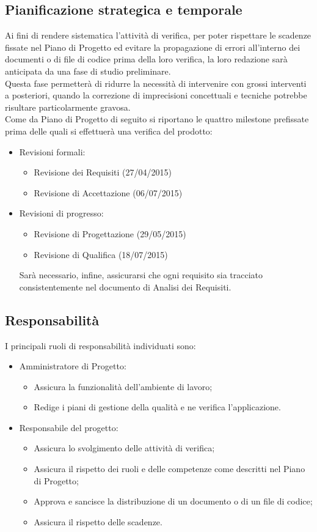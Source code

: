 \subsection{Pianificazione strategica e temporale}

Ai fini di rendere sistematica l'attività di verifica, per poter rispettare le scadenze fissate nel Piano di Progetto ed evitare la propagazione di errori all'interno dei documenti o di file di codice prima della loro verifica, la loro redazione sarà anticipata da una fase di studio preliminare. \\
Questa fase permetterà di ridurre la necessità di intervenire con grossi interventi a posteriori, quando la correzione di imprecisioni concettuali e tecniche potrebbe risultare particolarmente gravosa. \\
Come da Piano di Progetto di seguito si riportano le quattro milestone prefissate prima delle quali si effettuerà una verifica del prodotto:
\begin{itemize}
	\item Revisioni formali:
	\begin{itemize}
		\item Revisione dei Requisiti (27/04/2015)
		\item Revisione di Accettazione (06/07/2015)
	\end{itemize}
	\item Revisioni di progresso:
	\begin{itemize}
		\item Revisione di Progettazione (29/05/2015)
		\item Revisione di Qualifica (18/07/2015)
	\end{itemize}
	Sarà necessario, infine, assicurarsi che ogni requisito sia tracciato consistentemente nel documento di Analisi dei Requisiti.
\end{itemize}

\subsection{Responsabilità}
I principali ruoli di responsabilità individuati sono:
\begin{itemize}
	\item Amministratore di Progetto:
	\begin{itemize}
		\item Assicura la funzionalità dell'ambiente di lavoro;
		\item Redige i piani di gestione della qualità e ne verifica l'applicazione.
	\end{itemize}
	\item Responsabile del progetto:
	\begin{itemize}
		\item Assicura lo svolgimento delle attività di verifica;
		\item Assicura il rispetto dei ruoli e delle competenze come descritti nel Piano di Progetto;
		\item Approva e sancisce la distribuzione di un documento o di un file di codice;
		\item Assicura il rispetto delle scadenze.
	\end{itemize}
\end{itemize}

